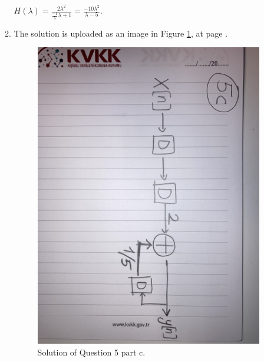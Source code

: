 \documentclass[10pt,a4paper, margin=1in]{article}
\begin{document}
\begin{enumerate}
\begin{enumerate}
    $H(\lambda) = \frac{2\lambda^2}{\frac{-1}{5}\lambda + 1} = \frac{-10\lambda^2}{\lambda - 5}.$\vspace{0.3cm}\\
	\item %
    The solution is uploaded as an image in Figure \ref{fig:q5c}, at page \pageref{fig:q5c}.
    \begin{figure}[htbp]
        \centering
        \includegraphics[width=1\linewidth]{q5c.jpg}
        \caption{Solution of Question 5 part c.}
        \label{fig:q5c}
    \end{figure}\vspace{0.3cm}\\
    \end{enumerate} 
    

\end{enumerate}
\end{document}
